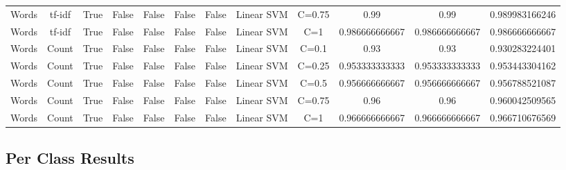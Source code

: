 \documentclass[11pt]{article}
\begin{document}
\begin{tabular}{|c|c|c|c|c|c|c|c|c|c|c|c|}
Words & tf-idf & True & False & False & False & False & Linear SVM & C=0.75 & 0.99 & 0.99 & 0.989983166246 \\ 
Words & tf-idf & True & False & False & False & False & Linear SVM & C=1 & 0.986666666667 & 0.986666666667 & 0.986666666667 \\ 
Words & Count & True & False & False & False & False & Linear SVM & C=0.1 & 0.93 & 0.93 & 0.930283224401 \\ 
Words & Count & True & False & False & False & False & Linear SVM & C=0.25 & 0.953333333333 & 0.953333333333 & 0.953443304162 \\ 
Words & Count & True & False & False & False & False & Linear SVM & C=0.5 & 0.956666666667 & 0.956666666667 & 0.956788521087 \\ 
Words & Count & True & False & False & False & False & Linear SVM & C=0.75 & 0.96 & 0.96 & 0.960042509565 \\ 
Words & Count & True & False & False & False & False & Linear SVM & C=1 & 0.966666666667 & 0.966666666667 & 0.966710676569 \\ 
\hline
  \end{tabular}
  
  \clearpage
  \subsection{Per Class Results}
    
\end{document}
